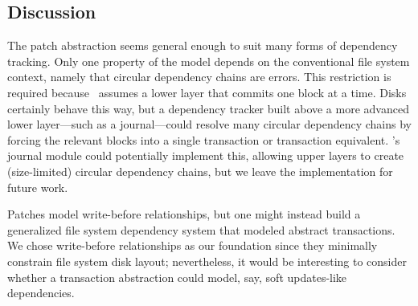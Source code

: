 


\subsection{Discussion}

The patch abstraction seems general enough to suit many forms of
 dependency tracking.
%
Only one property of the model depends on the conventional file system context,
 namely that circular dependency chains are errors.
%
This restriction is required because \Kudos\ assumes a lower layer that
 commits one block at a time.
%
Disks certainly behave this way, but a dependency tracker built above a
 more advanced lower layer---such as a journal---could resolve many
 circular dependency chains by forcing the relevant blocks into a single
 transaction or transaction equivalent.
%
\Featherstitch's journal module could potentially implement this, allowing
 upper layers to create (size-limited) circular dependency chains, but we
 leave the implementation for future work.

Patches model write-before relationships, but one might instead build a
 generalized file system dependency system that modeled abstract
 transactions.
%
We chose write-before relationships as our foundation since they minimally
 constrain file system disk layout; nevertheless, it would be interesting
 to consider whether a transaction abstraction could model, say, soft
 updates-like dependencies.
